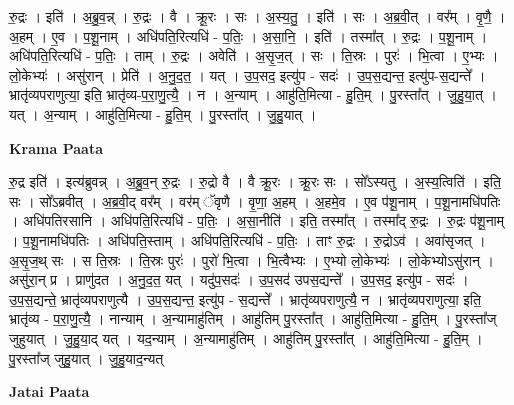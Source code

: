 \documentclass[17pt]{extarticle}
\begin{document}
रु॒द्रः । इति॑ । अ॒ब्रु॒व॒न्न् । रु॒द्रः । वै । क्रू॒रः । सः । अ॒स्य॒तु॒ । इति॑ । सः । अ॒ब्र॒वी॒त् । वर᳚म् । वृ॒णै॒ । अ॒हम् । ए॒व । प॒शू॒नाम् । अधि॑पति॒रित्यधि॑ - प॒तिः॒ । अ॒सा॒नि॒ । इति॑ । तस्मा᳚त् । रु॒द्रः । प॒शू॒नाम् । अधि॑पति॒रित्यधि॑ - प॒तिः॒ । ताम् । रु॒द्रः । अवेति॑ । अ॒सृ॒ज॒त् । सः । ति॒स्रः । पुरः॑ । भि॒त्वा । ए॒भ्यः । लो॒केभ्यः॑ । असु॑रान् । प्रेति॑ । अ॒नु॒द॒त॒ । यत् । उ॒प॒सद॒ इत्यु॑प - सदः॑ । उ॒प॒स॒द्यन्त॒ इत्यु॑प-स॒द्यन्ते᳚ । भ्रातृ॑व्यपराणुत्या॒ इति॒ भ्रातृ॑व्य-प॒रा॒णु॒त्यै॒ । न । अ॒न्याम् । आहु॑ति॒मित्या - हु॒ति॒म् । पु॒रस्ता᳚त् । जु॒हु॒या॒त् । यत् । अ॒न्याम् । आहु॑ति॒मित्या - हु॒ति॒म् । पु॒रस्ता᳚त् । जु॒हु॒यात् ।  \newline


\textbf{Krama Paata} \newline

रु॒द्र इति॑ । इत्य॑ब्रुवन्न् । अ॒ब्रु॒व॒न् रु॒द्रः । रु॒द्रो वै । वै क्रू॒रः । क्रू॒रः सः । सो᳚ऽस्यतु । अ॒स्य॒त्विति॑ । इति॒ सः । सो᳚ऽब्रवीत् । अ॒ब्र॒वी॒द् वर᳚म् । वर॑म् ॅवृणै । वृ॒णा॒ अ॒हम् । अ॒हमे॒व । ए॒व प॑शू॒नाम् । प॒शू॒नामधि॑पतिः । अधि॑पतिरसानि । अधि॑पति॒रित्यधि॑ - प॒तिः॒ । अ॒सा॒नीति॑ । इति॒ तस्मा᳚त् । तस्मा᳚द् रु॒द्रः । रु॒द्रः प॑शू॒नाम् । प॒शू॒नामधि॑पतिः । अधि॑पति॒स्ताम् । अधि॑पति॒रित्यधि॑ - प॒तिः॒ । ताꣳ रु॒द्रः । रु॒द्रोऽव॑ । अवा॑सृजत् । अ॒सृ॒ज॒थ् सः । स ति॒स्रः । ति॒स्रः पुरः॑ । पुरो॑ भि॒त्वा । भि॒त्वैभ्यः । ए॒भ्यो लो॒केभ्यः॑ । लो॒केभ्योऽसु॑रान् । असु॑रा॒न् प्र । प्राणु॑दत । अ॒नु॒द॒त॒ यत् । यदु॑प॒सदः॑ । उ॒प॒सद॑ उपस॒द्यन्ते᳚ । उ॒प॒सद॒ इत्यु॑प - सदः॑ । उ॒प॒स॒द्यन्ते॒ भ्रातृ॑व्यपराणुत्यै । उ॒प॒स॒द्यन्त॒ इत्यु॑प - स॒द्यन्ते᳚ । भ्रातृ॑व्यपराणुत्यै॒ न । भ्रातृ॑व्यपराणुत्या॒ इति॒ भ्रातृ॑व्य - प॒रा॒णु॒त्यै॒ । नान्याम् । अ॒न्यामाहु॑तिम् । आहु॑तिम् पु॒रस्ता᳚त् । आहु॑ति॒मित्या - हु॒ति॒म् । पु॒रस्ता᳚ज् जुहुयात् । जु॒हु॒या॒द् यत् । यद॒न्याम् । अ॒न्यामाहु॑तिम् । आहु॑तिम् पु॒रस्ता᳚त् । आहु॑ति॒मित्या - हु॒ति॒म् । पु॒रस्ता᳚ज् जुहु॒यात् । जु॒हु॒याद॒न्यत् \newline

\textbf{Jatai Paata} \newline
\end{document}
